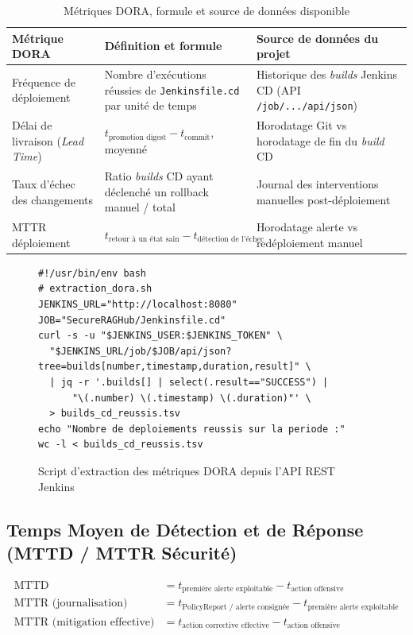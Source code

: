 \begin{table}[htbp]
\centering
\scriptsize
\begin{tabular}{@{}p{2.6cm}p{5.4cm}p{5cm}@{}}
\toprule
\textbf{Métrique DORA} & \textbf{Définition et formule} & \textbf{Source de données du projet} \\
\midrule
Fréquence de déploiement & Nombre d'exécutions réussies de \texttt{Jenkinsfile.cd} par unité de temps & Historique des \textit{builds} Jenkins CD (API \texttt{/job/.../api/json}) \\
Délai de livraison (\textit{Lead Time}) & $t_{\text{promotion digest}} - t_{\text{commit}}$, moyenné & Horodatage Git vs horodatage de fin du \textit{build} CD \\
Taux d'échec des changements & Ratio \textit{builds} CD ayant déclenché un rollback manuel / total & Journal des interventions manuelles post-déploiement \\
MTTR déploiement & $t_{\text{retour à un état sain}} - t_{\text{détection de l'échec}}$ & Horodatage alerte vs redéploiement manuel \\
\bottomrule
\end{tabular}
\caption{Métriques DORA, formule et source de données disponible}
\label{tab:dora_definitions}
\end{table}

\begin{figure}[htbp]
\centering
\begin{verbatim}
#!/usr/bin/env bash
# extraction_dora.sh
JENKINS_URL="http://localhost:8080"
JOB="SecureRAGHub/Jenkinsfile.cd"
curl -s -u "$JENKINS_USER:$JENKINS_TOKEN" \
  "$JENKINS_URL/job/$JOB/api/json?tree=builds[number,timestamp,duration,result]" \
  | jq -r '.builds[] | select(.result=="SUCCESS") |
      "\(.number) \(.timestamp) \(.duration)"' \
  > builds_cd_reussis.tsv
echo "Nombre de deploiements reussis sur la periode :"
wc -l < builds_cd_reussis.tsv
\end{verbatim}
\caption{Script d'extraction des métriques DORA depuis l'API REST Jenkins}
\label{fig:script_dora}
\end{figure}

\subsection{Temps Moyen de Détection et de Réponse (MTTD / MTTR Sécurité)}
\label{sub:mttd_mttr}

\begin{align*}
\text{MTTD} &= t_{\text{première alerte exploitable}} - t_{\text{action offensive}} \\
\text{MTTR (journalisation)} &= t_{\text{PolicyReport / alerte consignée}} - t_{\text{première alerte exploitable}} \\
\text{MTTR (mitigation effective)} &= t_{\text{action corrective effective}} - t_{\text{action offensive}}
\end{align*}

